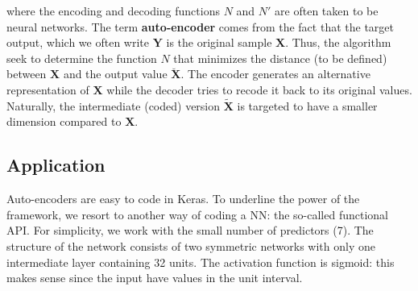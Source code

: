 \documentclass[]{krantz}
\makeatletter
\newenvironment{Shaded}{\begin{snugshade}}{\end{snugshade}}
\newcommand{\CommentTok}[1]{\textcolor[rgb]{0.37,0.37,0.37}{\textit{#1}}}
\newcommand{\DataTypeTok}[1]{\textcolor[rgb]{0.27,0.27,0.27}{#1}}
\newcommand{\DecValTok}[1]{\textcolor[rgb]{0.06,0.06,0.06}{#1}}
\newcommand{\KeywordTok}[1]{\textcolor[rgb]{0.27,0.27,0.27}{\textbf{#1}}}
\newcommand{\NormalTok}[1]{#1}
\newcommand{\OperatorTok}[1]{\textcolor[rgb]{0.43,0.43,0.43}{\textbf{#1}}}
\newcommand{\StringTok}[1]{\textcolor[rgb]{0.5,0.5,0.5}{#1}}
\newenvironment{kframe}{%
\medskip{}
\setlength{\fboxsep}{.8em}
 \def\at@end@of@kframe{}%
 \ifinner\ifhmode%
  \def\at@end@of@kframe{\end{minipage}}%
  \begin{minipage}{\columnwidth}%
 \fi\fi%
 \def\FrameCommand##1{\hskip\@totalleftmargin \hskip-\fboxsep
 \colorbox{shadecolor}{##1}\hskip-\fboxsep
     \hskip-\linewidth \hskip-\@totalleftmargin \hskip\columnwidth}%
 \MakeFramed {\advance\hsize-\width
   \@totalleftmargin\z@ \linewidth\hsize
   \@setminipage}}%
 {\par\unskip\endMakeFramed%
 \at@end@of@kframe}
\renewenvironment{Shaded}{\begin{kframe}}{\end{kframe}}
\theoremstyle{definition}
\theoremstyle{definition}
\theoremstyle{definition}
\theoremstyle{remark}
\makeatother
\begin{document}
where the encoding and decoding functions \(N\) and \(N'\) are often
taken to be neural networks. The term \textbf{auto-encoder} comes from
the fact that the target output, which we often write \(\textbf{Y}\) is
the original sample \(\textbf{X}\). Thus, the algorithm seek to
determine the function \(N\) that minimizes the distance (to be defined)
between \(\textbf{X}\) and the output value \(\breve{\textbf{X}}\). The
encoder generates an alternative representation of \(\textbf{X}\) while
the decoder tries to recode it back to its original values. Naturally,
the intermediate (coded) version \(\tilde{\textbf{X}}\) is targeted to
have a smaller dimension compared to \(\textbf{X}\).

\hypertarget{application}{%
\subsection{Application}\label{application}}

Auto-encoders are easy to code in Keras. To underline the power of the
framework, we resort to another way of coding a NN: the so-called
functional API. For simplicity, we work with the small number of
predictors (7). The structure of the network consists of two symmetric
networks with only one intermediate layer containing 32 units. The
activation function is sigmoid: this makes sense since the input have
values in the unit interval.

\footnotesize

\begin{Shaded}
\end{Shaded}
\end{document}
